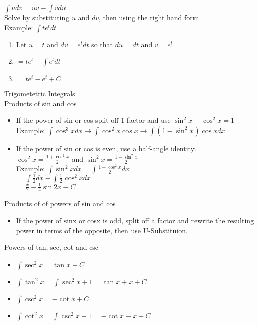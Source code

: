 \documentclass{article}
\begin{document}
$\int{udv} = uv - \int{vdu}$\\

Solve by substituting $u$ and $dv$, then using the right hand form.\\

\noindent
Example: $\int{t e^t dt}$
\begin{enumerate}
  \item Let $u = t$ and $dv = e^t dt$ so that $du = dt$ and $v = e^t$
  \item $= t e^t - \int{e^t dt}$
  \item $= t e^t - e^t + C$
\end{enumerate}

\noindent
\Large
Trigometetric Integrals\\
\normalsize
Products of sin and cos
\begin{itemize}
  \item If the power of sin or cos split off 1 factor and use $\sin^2x + \cos^2x = 1$\\
  Example: $\int{\cos^3x dx} \to \int{\cos^2x \cos x} \to \int{(1-\sin^2x)\cos x dx}$
  \item If the power of sin or cos is even, use a half-angle identity.\\
  $\cos^2x = \frac{1 + \cos^2x}{2}$ and $\sin^2x = \frac{1 - \sin^2x}{2}$\\
  Example: $\int{\sin^2x dx} = \int{\frac{1- \cos^2x}{2}dx}$\\
  $= \int{\frac{1}{2}dx} - \int{\frac{1}{2}\cos^2x dx}$\\
  $= \frac{x}{2} - \frac{1}{4}\sin 2x + C$
\end{itemize}

\noindent
Products of of powers of sin and cos
\begin{itemize}
  \item If the power of sinx or cosx is odd, split off a factor and rewrite the resulting power in terms of the opposite, then use U-Substituion.
\end{itemize}

\noindent
Powers of tan, sec, cot and csc
\begin{itemize}
  \item $\int{\sec^2x} = \tan x + C$
  \item $\int{\tan^2x} = \int{\sec^2x + 1} = \tan x + x + C$
  \item $\int{\csc^2x} = -\cot x + C$
  \item $\int{\cot^2x} = \int{\csc^2x + 1} = -\cot x + x + C$
\end{itemize}
\end{document}
